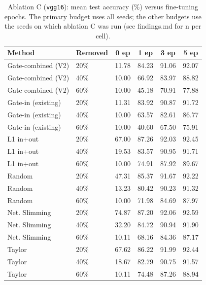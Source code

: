 \begin{table}[t]
\centering
\caption{Ablation C (\texttt{vgg16}): mean test accuracy (\%) versus fine-tuning epochs. The primary budget uses all seeds; the other budgets use the seeds on which ablation C was run (see findings.md for n per cell).}
\label{tab:ablation_c_vgg16}
\footnotesize
\setlength{\tabcolsep}{4pt}
\begin{tabular}{llcccc}
\toprule
Method & Removed & 0 ep & 1 ep & 3 ep & 5 ep \\
\midrule
Gate-combined (V2) & 20\% & 11.78 & 84.23 & 91.06 & 92.07 \\
Gate-combined (V2) & 40\% & 10.00 & 66.92 & 83.97 & 88.82 \\
Gate-combined (V2) & 60\% & 10.00 & 45.18 & 70.91 & 77.88 \\
Gate-in (existing) & 20\% & 11.31 & 83.92 & 90.87 & 91.72 \\
Gate-in (existing) & 40\% & 10.00 & 63.57 & 82.61 & 86.77 \\
Gate-in (existing) & 60\% & 10.00 & 40.60 & 67.50 & 75.91 \\
L1 in+out & 20\% & 67.00 & 87.26 & 92.03 & 92.45 \\
L1 in+out & 40\% & 19.53 & 83.57 & 90.95 & 91.71 \\
L1 in+out & 60\% & 10.00 & 74.91 & 87.92 & 89.67 \\
Random & 20\% & 47.31 & 85.37 & 91.67 & 92.22 \\
Random & 40\% & 13.23 & 80.42 & 90.23 & 91.32 \\
Random & 60\% & 10.00 & 71.98 & 84.69 & 87.97 \\
Net. Slimming & 20\% & 74.87 & 87.20 & 92.06 & 92.59 \\
Net. Slimming & 40\% & 32.20 & 84.72 & 90.94 & 91.90 \\
Net. Slimming & 60\% & 10.11 & 68.16 & 84.36 & 87.17 \\
Taylor & 20\% & 67.62 & 86.22 & 91.99 & 92.44 \\
Taylor & 40\% & 18.67 & 82.79 & 90.75 & 91.57 \\
Taylor & 60\% & 10.11 & 74.48 & 87.26 & 88.94 \\
\bottomrule
\end{tabular}
\end{table}
